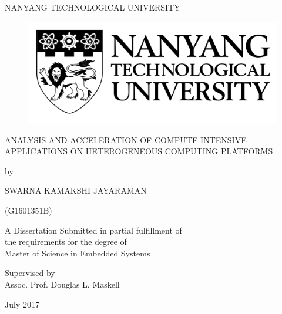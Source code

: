 \begin{titlepage}
\begin{center}
{\large {NANYANG TECHNOLOGICAL UNIVERSITY}}
\begin{figure}[!t]
\centering
\includegraphics[width= 8 cm]{figures/ntu_logo.pdf}
\end{figure} 

\vspace*{0.7in}
{\large ANALYSIS AND ACCELERATION OF COMPUTE-INTENSIVE APPLICATIONS ON HETEROGENEOUS COMPUTING PLATFORMS}
\par
\vspace{0.4 in}
{\large by\\}
\vspace{0.2 in}
{\large SWARNA KAMAKSHI JAYARAMAN

(G1601351B)}
\vspace{0.1 in}
\par
\vfill
A Dissertation Submitted in partial fulfillment of \\ the requirements for the degree of \\ Master of Science in Embedded Systems
\par
\vspace{0.4in}
Supervised by\\
\vspace{0.1in}
{\large Assoc. Prof. Douglas L. Maskell \\}
\par
\vspace{0.15in}
July 2017
\end{center}
\end{titlepage}